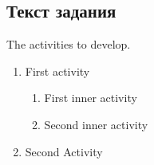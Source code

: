 \begin{center}	
    \section{Текст задания}
\end{center}
The activities to develop.
\begin{enumerate}
    \item First activity
    \begin{enumerate}
        \item First inner activity
        \item Second inner activity
    \end{enumerate}
    \item Second Activity
\end{enumerate}